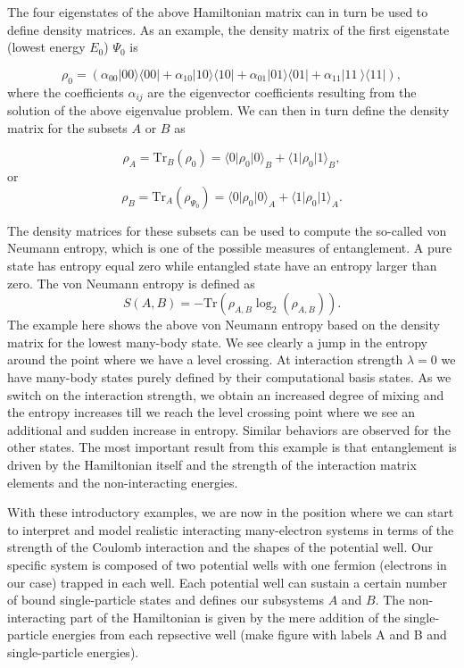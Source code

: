 \documentclass[twocolumn,superscriptaddress,unsortedaddress,
 amsmath,amssymb,
 aps,
]{revtex4-2}
\begin{document}
The four eigenstates of the above Hamiltonian matrix can in turn be used to
define density matrices. As an example, the density matrix of the
first eigenstate (lowest energy $E_0$) $\Psi_0$ is

\[
\rho_0=\left(\alpha_{00}\vert 00 \rangle\langle 00\vert+\alpha_{10}\vert 10 \rangle\langle 10\vert+\alpha_{01}\vert 01 \rangle\langle 01\vert+\alpha_{11}\vert 11\
 \rangle\langle 11\vert\right),
\]
where the coefficients $\alpha_{ij}$ are the eigenvector coefficients
resulting from the solution of the above eigenvalue problem.  We can
then in turn define the density matrix for the subsets $A$ or $B$ as

\[
\rho_A=\mathrm{Tr}_B(\rho_{0})=\langle 0 \vert \rho_{0} \vert 0\rangle_{B}+\langle 1 \vert \rho_{0} \vert 1\rangle_{B},
\]
or
\[
\rho_B=\mathrm{Tr}_A(\rho_{\Psi_0})=\langle 0 \vert \rho_{0} \vert 0\rangle_{A}+\langle 1 \vert \rho_{0} \vert 1\rangle_{A}.
\]

The density matrices for these subsets can be used to compute the
so-called von Neumann entropy, which is one of the possible measures
of entanglement. A pure state has entropy equal zero while entangled
state have an entropy larger than zero. The von Neumann entropy is
defined as
\[
S(A,B)=-\mathrm{Tr}\left(\rho_{A,B}\log_2 (\rho_{A,B})\right).
\]
The example here shows the above von Neumann entropy based on the
density matrix for the lowest many-body state. We see clearly a jump
in the entropy around the point where we have a level crossing. At
interaction strength $\lambda=0$ we have many-body states purely
defined by their computational basis states. As we switch on the
interaction strength, we obtain an increased degree of mixing and the
entropy increases till we reach the level crossing point where we see
an additional and sudden increase in entropy. Similar behaviors are
observed for the other states. The most important result from this
example is that entanglement is driven by the Hamiltonian itself and
the strength of the interaction matrix elements and the
non-interacting energies.


With these introductory examples, we are now in the position where we
can start to interpret and model realistic interacting many-electron
systems in terms of the strength of the Coulomb interaction and the
shapes of the potential well. Our specific system is composed of two
potential wells with one fermion (electrons in our case) trapped in
each well.  Each potential well can sustain a certain number of bound
single-particle states and defines our subsystems $A$ and $B$. The
non-interacting part of the Hamiltonian is given by the mere addition
of the single-particle energies from each repsective well (make figure
with labels A and B and single-particle energies).
\end{document}
